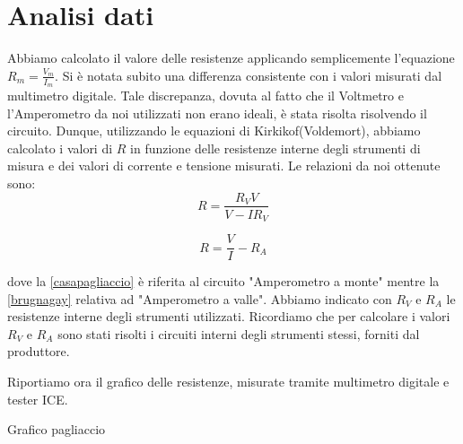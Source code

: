 \section{Analisi dati}

Abbiamo calcolato il valore delle resistenze applicando semplicemente l'equazione $R_m=\frac{V_m}{I_m}$. Si è notata subito una differenza consistente con i valori misurati dal multimetro digitale. Tale discrepanza, dovuta al fatto che il Voltmetro e l'Amperometro da noi utilizzati non erano ideali, è stata risolta risolvendo il circuito. Dunque, utilizzando le equazioni di Kirkikof(Voldemort), abbiamo calcolato i valori di $R$ in funzione delle resistenze interne degli strumenti di misura e dei valori di corrente e tensione misurati. Le relazioni da noi ottenute sono:
\begin{equation}
R=\frac{R_VV}{V-IR_V}
\label{casapagliaccio}
\end{equation} 

\begin{equation}
R=\frac{V}{I}-R_A
\label{brugnagay}
\end{equation} 

dove la \ref{casapagliaccio} è riferita al circuito "Amperometro a monte" mentre la \ref{brugnagay} relativa ad "Amperometro a valle". Abbiamo indicato con $R_V$ e $R_A$ le resistenze interne degli strumenti utilizzati. 
Ricordiamo che per calcolare i valori $R_V$ e $R_A$ sono stati risolti i circuiti interni degli strumenti stessi, forniti dal produttore. 

Riportiamo ora il grafico delle resistenze, misurate tramite multimetro digitale e tester ICE. 

\begin{center}
Grafico pagliaccio
\end{center}

